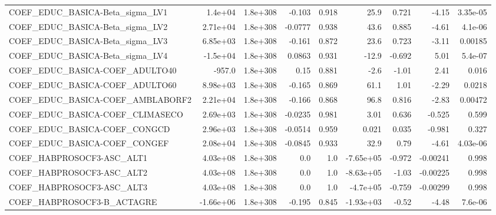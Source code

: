 \begin{tabular}{lrrrrrrrr}
COEF\_EDUC\_BASICA-Beta\_sigma\_LV1   &     1.4e+04 &     1.8e+308 &  -0.103 &    0.918 &       25.9 &       0.721 &        -4.15 &      3.35e-05 \\
COEF\_EDUC\_BASICA-Beta\_sigma\_LV2   &    2.71e+04 &     1.8e+308 & -0.0777 &    0.938 &       43.6 &       0.885 &        -4.61 &       4.1e-06 \\
COEF\_EDUC\_BASICA-Beta\_sigma\_LV3   &    6.85e+03 &     1.8e+308 &  -0.161 &    0.872 &       23.6 &       0.723 &        -3.11 &       0.00185 \\
COEF\_EDUC\_BASICA-Beta\_sigma\_LV4   &    -1.5e+04 &     1.8e+308 &  0.0863 &    0.931 &      -12.9 &      -0.692 &         5.01 &       5.4e-07 \\
COEF\_EDUC\_BASICA-COEF\_ADULTO40    &      -957.0 &     1.8e+308 &    0.15 &    0.881 &       -2.6 &       -1.01 &         2.41 &         0.016 \\
COEF\_EDUC\_BASICA-COEF\_ADULTO60    &    8.98e+03 &     1.8e+308 &  -0.165 &    0.869 &       61.1 &        1.01 &        -2.29 &        0.0218 \\
COEF\_EDUC\_BASICA-COEF\_AMBLABORF2  &    2.21e+04 &     1.8e+308 &  -0.166 &    0.868 &       96.8 &       0.816 &        -2.83 &       0.00472 \\
COEF\_EDUC\_BASICA-COEF\_CLIMASECO   &    2.69e+03 &     1.8e+308 & -0.0235 &    0.981 &       3.01 &       0.636 &       -0.525 &         0.599 \\
COEF\_EDUC\_BASICA-COEF\_CONGCD      &    2.96e+03 &     1.8e+308 & -0.0514 &    0.959 &      0.021 &       0.035 &       -0.981 &         0.327 \\
COEF\_EDUC\_BASICA-COEF\_CONGEF      &    2.08e+04 &     1.8e+308 & -0.0845 &    0.933 &       32.9 &        0.79 &        -4.61 &      4.03e-06 \\
COEF\_HABPROSOCF3-ASC\_ALT1         &    4.03e+08 &     1.8e+308 &     0.0 &      1.0 &  -7.65e+05 &      -0.972 &     -0.00241 &         0.998 \\
COEF\_HABPROSOCF3-ASC\_ALT2         &    4.03e+08 &     1.8e+308 &     0.0 &      1.0 &  -8.63e+05 &       -1.03 &     -0.00225 &         0.998 \\
COEF\_HABPROSOCF3-ASC\_ALT3         &    4.03e+08 &     1.8e+308 &     0.0 &      1.0 &   -4.7e+05 &      -0.759 &     -0.00299 &         0.998 \\
COEF\_HABPROSOCF3-B\_ACTAGRE        &   -1.66e+06 &     1.8e+308 &  -0.195 &    0.845 &  -1.93e+03 &       -0.52 &        -4.48 &       7.6e-06 \\

\end{tabular}
